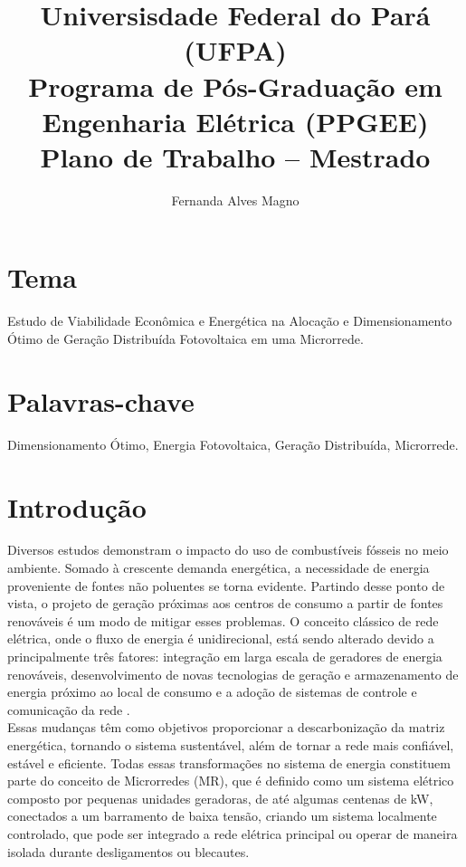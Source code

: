 \documentclass[]{IEEEphot}
\title{\textbf{Universisdade Federal do Pará (UFPA)\\Programa de Pós-Graduação em Engenharia Elétrica (PPGEE)\\Plano de Trabalho – Mestrado}}
\begin{document}
\author{Fernanda Alves Magno}


\maketitle




	\section{Tema}
Estudo de Viabilidade Econômica e Energética na Alocação e Dimensionamento Ótimo de Geração Distribuída Fotovoltaica em uma Microrrede.

\section{Palavras-chave}
Dimensionamento Ótimo, Energia Fotovoltaica, Geração Distribuída, Microrrede.

\section{Introdução}
Diversos estudos demonstram o impacto do uso de combustíveis fósseis no meio ambiente. Somado à crescente demanda energética, a necessidade de energia proveniente de fontes não poluentes se torna evidente. Partindo desse ponto de vista, o projeto de geração próximas aos centros de consumo a partir de fontes renováveis é um modo de mitigar esses problemas. O conceito clássico de rede elétrica, onde o fluxo de energia é unidirecional, está sendo alterado devido a principalmente três fatores: integração em larga escala de geradores de energia renováveis, desenvolvimento de novas tecnologias de geração e armazenamento de energia
próximo ao local de consumo e a adoção de sistemas de controle e comunicação da rede \cite{Pfitscher2013}.\\
Essas mudanças têm como objetivos proporcionar a descarbonização da matriz energética, tornando o sistema sustentável, além de tornar a rede mais confiável, estável e eficiente. Todas essas transformações no sistema de energia constituem parte do conceito de Microrredes (MR), que é definido como um sistema elétrico composto por pequenas unidades geradoras, de até algumas centenas de kW, conectados a um barramento de baixa tensão, criando um sistema localmente controlado, que pode ser integrado a rede elétrica principal ou operar de maneira isolada durante desligamentos ou blecautes.
\end{document}
